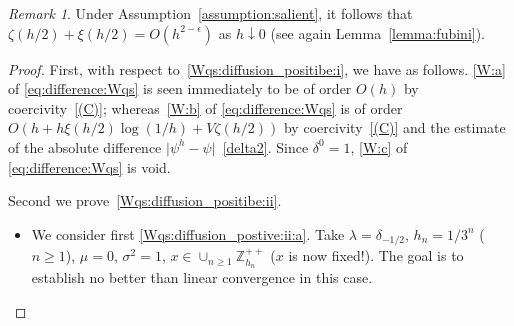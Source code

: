 \documentclass[pdftex,oneside,11pt,reqno]{amsart}
\theoremstyle{definition}
\theoremstyle{theorem}
\theoremstyle{remark}
\newtheorem{remark}{Remark}[section]
\numberwithin{equation}{section}
\numberwithin{definition}{section}
\begin{document}
\begin{remark}\label{remark:under_assumption_salient_etc}
Under Assumption~\ref{assumption:salient}, it follows that $\zeta(h/2)+\xi(h/2)=O(h^{2-\epsilon})$ as $h\downarrow 0$ (see again Lemma~\ref{lemma:fubini}).
\end{remark}

\begin{proof}
First, with respect to~\ref{Wqs:diffusion_positibe:i}, we have as follows. \ref{W:a} of \eqref{eq:difference:Wqs} is seen immediately to be of order $O(h)$ by coercivity~\ref{(C)}; whereas~\ref{W:b} of \eqref{eq:difference:Wqs} is of order $O(h+h\xi(h/2)\log(1/h)+V\zeta(h/2))$ by coercivity~\ref{(C)} and the estimate of the absolute difference $\vert \psi^h-\psi\vert$~\ref{delta2}. Since $\delta^0=1$, \ref{W:c} of \eqref{eq:difference:Wqs} is void. 

Second we prove~\ref{Wqs:diffusion_positibe:ii}.
\begin{itemize}
\item We consider first \ref{Wqs:diffusion_postive:ii:a}. Take ${\lambda}=\delta_{-1/2}$, $h_n=1/3^n$ ($n\geq 1$), ${\mu}=0$, ${\sigma^2}=1$, $x\in \cup_{n \geq 1}\mathbb{Z}_{h_n}^{++}$ ($x$ is now fixed!). The goal is to establish no better than linear convergence in this case. 
\end{itemize}


\end{proof}
\end{document}
